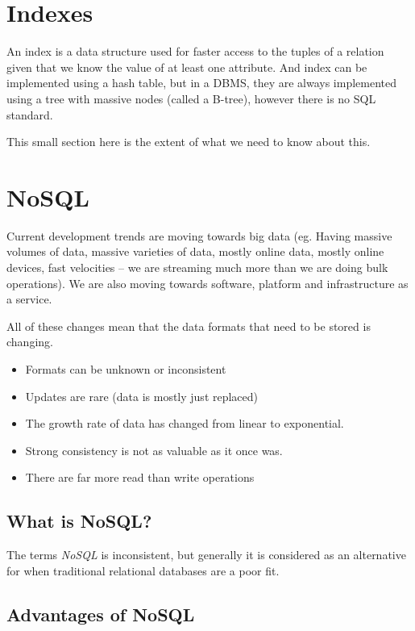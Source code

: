 \section{Indexes}\label{sec:indexes}

An index is a data structure used for faster access to the tuples of a relation given that we know the value of at least one attribute.
And index can be implemented using a hash table, but in a DBMS, they are always implemented using a tree with massive nodes (called a B-tree), however there is no SQL standard.

\begin{note}
    This small section here is the extent of what we need to know about this.
\end{note}

\section{NoSQL}\label{sec:nosql}

Current development trends are moving towards big data (eg. Having massive volumes of data, massive varieties of data, mostly online data, mostly online devices, fast velocities -- we are streaming much more than we are doing bulk operations).
We are also moving towards software, platform and infrastructure as a service.

All of these changes mean that the data formats that need to be stored is changing.
\begin{itemize}
    \item Formats can be unknown or inconsistent
    \item Updates are rare (data is mostly just replaced)
    \item The growth rate of data has changed from linear to exponential.
    \item Strong consistency is not as valuable as it once was.
    \item There are far more read than write operations
\end{itemize}

\subsection{What is NoSQL?}\label{sub:what_is_nosql_}

The terms \emph{NoSQL} is inconsistent, but generally it is considered as an alternative for when traditional relational databases are a poor fit.

\subsection{Advantages of NoSQL}\label{sub:advantages_of_nosql}

